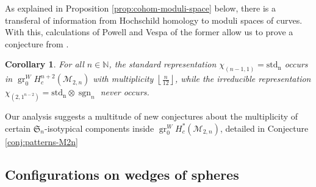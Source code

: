 \documentclass[12pt]{article}
\newcommand{\N}{\mathbb{N}}
\newcommand{\SymGroup}[1][n]{\mathfrak{S}_{#1}}
\newcommand{\Specht}[1]{\chi_{#1}}
\newcommand{\ModuliCurve}[1]{\mathcal{M}_{#1}}
\newcommand{\sgn}[1][n]{\operatorname{sgn}_{#1}}
\DeclareMathOperator{\gr}{gr}
\theoremstyle{plain}
\newtheorem{cor}[thm]{Corollary}
\theoremstyle{definition}
\theoremstyle{remark}
\begin{document}

As explained in Proposition \ref{prop:cohom-moduli-space} below, there is a transferal of information from Hochschild homology to moduli spaces of curves. With this, calculations of Powell and Vespa of the former allow us to prove a conjecture from \cite{BCGY21}.

\begin{cor} \label{cor:conjecture}
For all $n\in \N$, the standard representation $\Specht{(n-1,1)}=\operatorname{std_n}$  occurs in $\gr^W_0 H^{n+2}_c(\ModuliCurve{2,n})$ with multiplicity $\left\lfloor \frac{n}{12} \right\rfloor$, while the irreducible representation $\Specht{(2,1^{n-2})}=\operatorname{std_n}\otimes \sgn$ never occurs.
\end{cor}

Our analysis suggests a multitude of new conjectures about the multiplicity of certain $\SymGroup$-isotypical components inside $\gr_0^W H_c^*(\ModuliCurve{2,n})$, detailed in Conjecture \ref{conj:patterns-M2n}

\subsection{Configurations on wedges of spheres}
\end{document}
